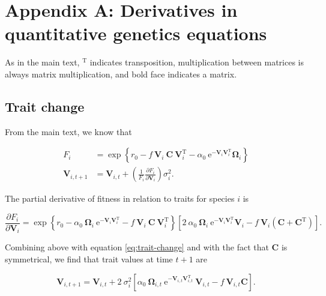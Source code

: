 \section*{Appendix A: Derivatives in quantitative genetics equations}

\renewcommand{\thefigure}{A\arabic{figure}}
\renewcommand{\theequation}{A\arabic{equation}}
\renewcommand{\thetable}{A\arabic{table}}
\setcounter{equation}{0}
\setcounter{figure}{0}
\setcounter{table}{0}


As in the main text, $^{\textrm{T}}$ indicates transposition,
multiplication between matrices is always matrix multiplication, and
bold face indicates a matrix.

\subsection*{Trait change}

From the main text, we know that

\begin{equation*}
\begin{split}
    F_{i} &= \exp \left\{
        r_0 - f ~ \mathbf{V}_i ~ \mathbf{C} ~ \mathbf{V}_{i}^{\textrm{T}} -
        \alpha_0 ~\textrm{e}^{- \mathbf{V}_i \mathbf{V}_i^{\textrm{T}} } \mathbf{\Omega}_{i}
        \right\} \\
    \mathbf{V}_{i,t+1} &= \mathbf{V}_{i,t} + \left( \frac{1}{F_i}
        \frac{\partial F_i}{\partial \mathbf{V}_{i}} \right) \sigma^2_i
    \textrm{.}
\end{split}
\end{equation*}


The partial derivative of fitness in relation to traits for species $i$ is

$$
\frac{ \partial F_i }{ \partial \mathbf{V}_i } =
        \exp \left\{
            r_0 - \alpha_0 ~ \mathbf{\Omega}_i ~
                \textrm{e}^{- \mathbf{V}_i \mathbf{V}_{i}^{\textrm{T}}}
            - f ~ \mathbf{V}_i ~ \mathbf{C} ~ \mathbf{V}_{i}^{\textrm{T}}
        \right\}
        \left[
            2 ~ \alpha_0 ~ \mathbf{\Omega}_i ~
                \textrm{e}^{- \mathbf{V}_i \mathbf{V}_{i}^{\textrm{T}}}
                \mathbf{V}_i
            - f ~ \mathbf{V}_i (\mathbf{C} + \mathbf{C}^{\textrm{T}})
        \right]
    \textrm{.}
$$

Combining above with equation \ref{eq:trait-change} and with the fact that
$\mathbf{C}$ is symmetrical, we find that trait values at time $t+1$ are

\begin{equation} \label{eq:trait-change-full}
    \mathbf{V}_{i,t+1} = \mathbf{V}_{i,t} + 2 ~ \sigma_i^2
    \left[
        \alpha_0 ~ \mathbf{\Omega}_{i,t} ~
            \textrm{e}^{-\mathbf{V}_{i,t} \mathbf{V}_{i,t}^\textrm{T}} ~ \mathbf{V}_{i,t}
        - f ~ \mathbf{V}_{i,t} \mathbf{C}
    \right]
    \textrm{.}
\end{equation}


